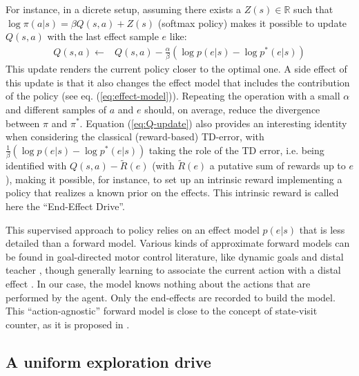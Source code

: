 \documentclass[runningheads]{llncs}
\begin{document}
For instance, in a dicrete setup, assuming there exists a $Z(s) \in \mathbb{R}$ such that $\log \pi(a|s) = \beta Q(s,a) + Z(s)$ (softmax policy) makes it possible to update $Q(s,a)$ with the last effect sample $e$ like:
\begin{align}\label{eq:Q-update}
Q(s,a) \leftarrow & Q(s,a) - \frac{\alpha}{\beta} (\log p(e|s) - \log p^*(e|s))
\end{align}  
This update renders the current policy closer to the optimal one. A side effect of this update is that it also changes the effect model that includes the contribution of the policy (see eq. (\ref{eq:effect-model})). Repeating the operation with a small $\alpha$ and different samples of $a$ and $e$ should, on average, reduce the divergence between $\pi$ and $\pi^*$.
Equation (\ref{eq:Q-update}) also provides an interesting identity when considering the classical (reward-based) TD-error, with $\frac{1}{\beta} (\log p(e|s) - \log p^*(e|s))$ taking the role of the TD error, i.e. being identified with $Q(s,a)- \tilde{R}(e)$ (with $\tilde{R}(e)$ a putative sum of rewards up to $e$),
making it possible, for instance, to set up an intrinsic reward implementing a policy that realizes a known prior on the effects. 
This intrinsic reward is called here the ``End-Effect Drive''.

This supervised approach to policy relies on an effect model $p(e|s)$ that is less detailed than a forward model. Various kinds of approximate forward models can be found in goal-directed motor control literature, like dynamic goals \cite{kaelbling1993learning} and distal teacher \cite{jordan1992forward}, though generally learning to associate the current action with a distal effect \cite{mishra2017prediction,kurutach2018model}. In our case, the model knows nothing about the actions that are performed by the agent. Only the end-effects are recorded to build the model. This ``action-agnostic'' forward model is close to the concept of state-visit counter, as it is proposed in \cite{bellemare2016unifying}.



\subsection{A uniform exploration drive}
\end{document}

